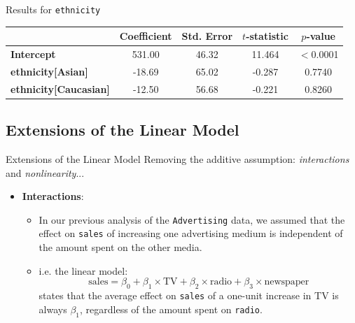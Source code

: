 \documentclass[aspectratio=169, 11pt]{beamer}
\begin{document}
\begin{frame}{Results for \texttt{ethnicity}}
  \begin{table}
    \centering
    \begin{tabular}{l c c c c}
      \toprule
      & \textbf{Coefficient} & \textbf{Std. Error} & \textbf{$t$-statistic} & \textbf{$p$-value} \\
      \midrule
      \textbf{Intercept}            & 531.00 & 46.32 & 11.464 & $<$0.0001 \\
      \textbf{ethnicity[Asian]}     & -18.69 & 65.02 & -0.287 &    0.7740 \\
      \textbf{ethnicity[Caucasian]} & -12.50 & 56.68 & -0.221 &    0.8260 \\
      \bottomrule
    \end{tabular}
  \end{table}
\end{frame}

\subsection{Extensions of the Linear Model}

\begin{frame}{Extensions of the Linear Model}
  Removing the additive assumption: \textit{interactions} and \textit{nonlinearity}...
  \begin{itemize}
    \item \textbf{Interactions}:
      \begin{itemize}
        \item In our previous analysis of the \texttt{Advertising} data, we assumed that the effect on \texttt{sales} of increasing one advertising medium is independent of the amount spent on the other media.

        \item i.e. the linear model:
          \[ \text{sales} = \beta_0 + \beta_1 \times \text{TV} + \beta_2 \times \text{radio} + \beta_3 \times \text{newspaper} \]
        states that the average effect on \texttt{sales} of a one-unit increase in TV is always $\beta_1$, regardless of the amount spent on \texttt{radio}.
    \end{itemize}
  \end{itemize}
\end{frame}
\end{document}
